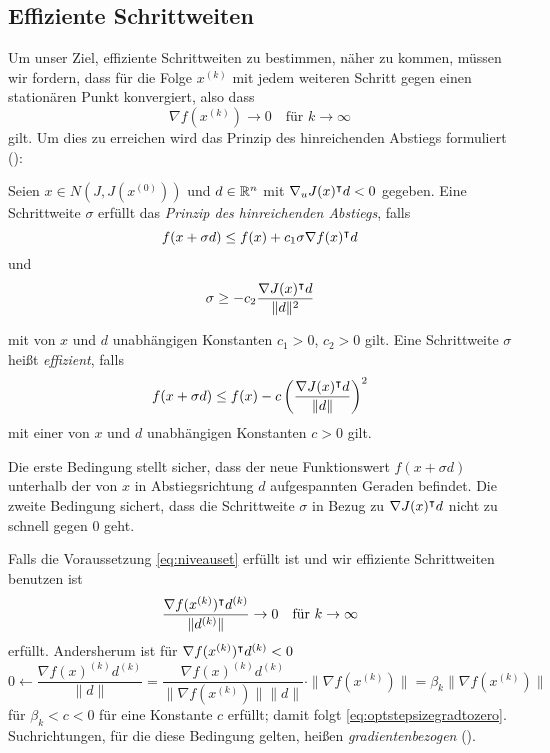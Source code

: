 \subsection{Effiziente Schrittweiten}
Um unser Ziel, effiziente Schrittweiten zu bestimmen, näher zu kommen, müssen wir fordern, dass für die Folge $x^{(k)}$ mit jedem weiteren Schritt gegen einen stationären Punkt konvergiert, also dass  
\begin{equation}
\label{eq:optstepsizegradtozero}
 \nabla f(x^{(k)})\to 0 \quad \text{für }k\to \infty
\end{equation}
gilt.
Um dies zu erreichen wird das Prinzip des hinreichenden Abstiegs formuliert (\cite[Def. 4.4.2]{alt2002nichtlineare}):
\begin{definition}
\label{def:sufficientdescent}
 Seien $x\in N(J,J(x^{(0)}))$ und $d\in \mathbb{R}^n$ mit $\nabla_u J(x)^\intercal d<0$ gegeben. Eine Schrittweite $\sigma$ erfüllt das \textit{Prinzip des hinreichenden Abstiegs}, falls
 \begin{equation}
 \label{eq:armijo1}
  f(x+\sigma d) \leq f(x) + c_1\sigma \nabla f(x)^\intercal d
 \end{equation}
 und 
 \begin{equation}
\label{eq:armijo2}
 \sigma \geq -c_2 \frac{\nabla J(x)^\intercal d}{\|d\|^2}
 \end{equation}


mit von $x$ und $d$ unabhängigen Konstanten $c_1>0$, $c_2>0$ gilt. Eine Schrittweite $\sigma$ heißt \textit{effizient}, falls
\[
 f(x+\sigma d) \leq f(x) - c\left( \frac{\nabla J(x)^\intercal d}{\|d\|}\right)^2
\]
mit einer von $x$ und $d$ unabhängigen Konstanten $c>0$ gilt.
\end{definition}
Die erste Bedingung stellt sicher, dass der neue Funktionswert $f(x+\sigma d)$ unterhalb der von $x$ in Abstiegsrichtung $d$ aufgespannten Geraden befindet. 
Die zweite Bedingung sichert, dass die Schrittweite $\sigma$ in Bezug zu $\nabla J(x)^\intercal d$ nicht zu schnell gegen $0$ geht.

Falls die Voraussetzung \eqref{eq:niveauset} erfüllt ist und wir effiziente Schrittweiten benutzen ist 
\[
 \frac{\nabla f(x^{(k)})^\intercal d^{(k)}}{\|d^{(k)}\|} \to 0 \quad \text{für }k\to \infty
\]
erfüllt. Andersherum ist für $\nabla f(x^{(k)})^\intercal d^{(k)}<0$
\[
 0 \leftarrow \frac{\nabla f(x)^{(k)} d^{(k)}}{\|d\|} = \frac{\nabla f(x)^{(k)} d^{(k)}}{\|\nabla f(x^{(k)})\|\|d\|}\cdot \|\nabla f(x^{(k)})\| = \beta_k \|\nabla f(x^{(k)})\|
\]
für $\beta_k<c<0$ für eine Konstante $c$ erfüllt; damit folgt \eqref{eq:optstepsizegradtozero}. Suchrichtungen, für die diese Bedingung gelten, heißen \textit{gradientenbezogen} (\cite[Def. 4.4.4]{alt2002nichtlineare}).

